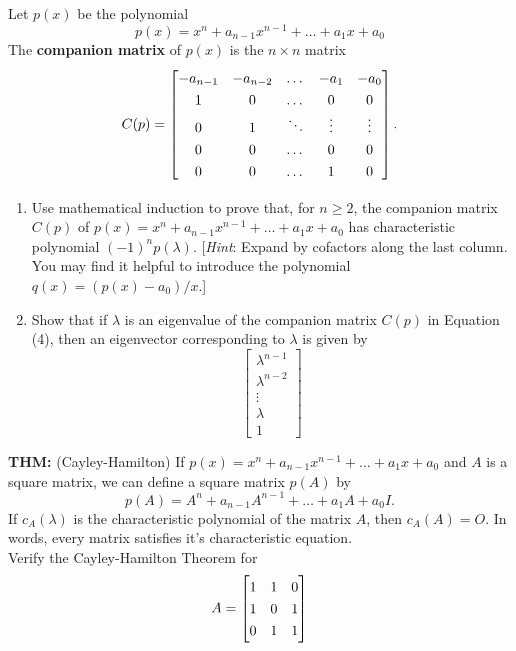 \documentclass[12pt,letterpaper]{hmcpset}
\newcommand{\m}[1]{\renewcommand*{\arraystretch}{1.3} \begin{bmatrix} #1 \end{bmatrix}}
\begin{document}
\begin{solution}
\vfill
\end{solution}
\newpage

\begin{problem}[4.3.32]

    Let $p(x)$ be the polynomial
    \[
        p(x) = x^n + a_{n-1}x^{n-1} + \dots + a_1x + a_0
    \]
    The \textbf{companion matrix} of $p(x)$ is
    the $n \times n$ matrix
    \[
        C(p) = \m{-a_{n-1}&-a_{n-2}&\dots&-a_1&-a_0\\
                1&0&\dots&0&0\\
                0&1&\ddots&\vdots&\vdots\\
                0&0&\dots&0&0\\
                0&0&\dots&1&0}.
    \]

    \begin{enumerate}
    \item Use mathematical induction to prove that, for $n \geq 2$, the companion matrix $C(p)$ of $p(x) = x^n + a_{n-1}x^{n-1} + \dots + a_1x + a_0$ has characteristic polynomial $(-1)^np(\lambda)$. [\emph{Hint}: Expand by cofactors along the last column. You may find it helpful to introduce the polynomial $q(x) = (p(x) -a_0)/x$.]
    
    \item Show that if $\lambda$ is an eigenvalue of the companion matrix $C(p)$ in Equation (4), then an eigenvector corresponding to $\lambda$ is given by
        $$\m{\lambda^{n-1}\\\lambda^{n-2}\\ \vdots \\ \lambda \\ 1}$$
    \end{enumerate}

\end{problem}

\begin{solution}
\vfill
\end{solution}
\newpage

\begin{problem}[4.3.34]
    \textbf{THM:} (Cayley-Hamilton)
    If $p(x)=x^n + a_{n-1}x^{n-1}+\dots+a_1x+a_0$
    and $A$ is a square matrix, we can define
    a square matrix $p(A)$ by
    \[
        p(A) = A^n + a_{n-1}A^{n-1} + \dots + a_1A+a_0I.
    \]
    If $c_A(\lambda)$ is the characteristic
    polynomial of the matrix $A$, then $c_A(A)
    =O$. In words, every matrix satisfies it's
    characteristic equation.\\

    Verify the Cayley-Hamilton Theorem for
    $$ A = \m{1 & 1 & 0 \\ 1 & 0 & 1 \\ 0 & 1 & 1}$$
\end{problem}

\begin{solution}
\vfill
\end{solution}
\end{document}
